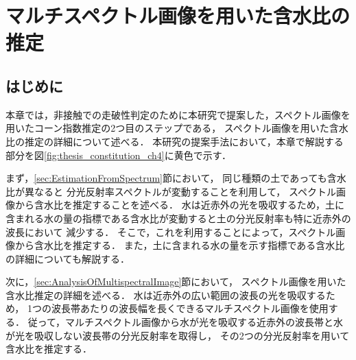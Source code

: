 \chapter{マルチスペクトル画像を用いた含水比の推定}
\thispagestyle{empty}
\label{ch:WaterContentEstimation}
\minitoc


\newpage


\section{はじめに}

本章では，非接触での走破性判定のために本研究で提案した，スペクトル画像を用いたコーン指数推定の2つ目のステップである，
スペクトル画像を用いた含水比の推定の詳細について述べる．
本研究の提案手法において，本章で解説する部分を図\ref{fig:thesis_constitution_ch4}に黄色で示す．


まず，\ref{sec:EstimationFromSpectrum}節において，
同じ種類の土であっても含水比が異なると
分光反射率スペクトルが変動することを利用して，
スペクトル画像から含水比を推定することを述べる．
水は近赤外の光を吸収するため，土に含まれる水の量の指標である含水比が変動すると土の分光反射率も特に近赤外の波長において
減少する．
そこで，これを利用することによって，スペクトル画像から含水比を推定する．%
また，土に含まれる水の量を示す指標である含水比の詳細についても解説する．


次に，\ref{sec:AnalysisOfMultispectralImage}節において，
スペクトル画像を用いた含水比推定の詳細を述べる．
水は近赤外の広い範囲の波長の光を吸収するため，
1つの波長帯あたりの波長幅を長くできるマルチスペクトル画像を使用する．
従って，マルチスペクトル画像から水が光を吸収する近赤外の波長帯と水が光を吸収しない波長帯の分光反射率を取得し，
その2つの分光反射率を用いて含水比を推定する．

